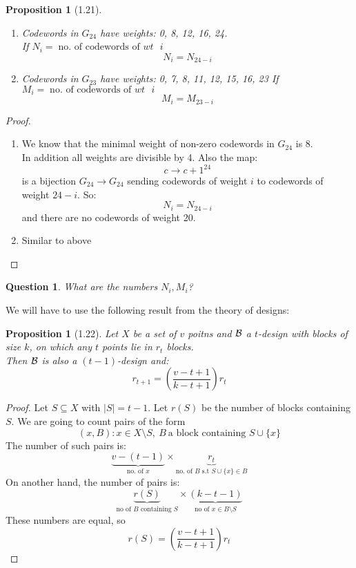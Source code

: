 \documentclass[]{article}
\newtheorem{prop}[thm]{Proposition}
\newtheorem*{quest}{Question}
\theoremstyle{definition}
\theoremstyle{remark}
\numberwithin{equation}{section}
\begin{document}
		\begin{prop}[1.21]\hfill
			\begin{enumerate}
				\item Codewords in $G_{24}$ have weights: 0, 8, 12, 16, 24.\\
					If $N_i = \; \text{no. of codewords of $wt$ $i$}$
					\[
						N_i = N_{24-i}
					\]
				\item Codewords in $G_{23}$ have weights: 0, 7, 8, 11, 12, 15, 16, 23
					If $M_i = \; \text{no. of codewords of $wt$ $i$}$
					\[
						M_i = M_{23-i}
					\]
			\end{enumerate}
		\end{prop}
		\begin{proof}\hfill
			\begin{enumerate}
				\item We know that the minimal weight of non-zero codewords in $G_{24}$ is 8.\\
				In addition all weights are divisible by 4. Also the map:\\
				\[
					c \longrightarrow c + 1^{24}
				\]
				is a bijection $G_{24} \rightarrow G_{24}$ sending codewords of weight $i$ to codewords of weight $24 - i$. So:
				\[
					N_i = N_{24-i}
				\]
				and there are no codewords of weight 20.
				\item Similar to above
			\end{enumerate}
		\end{proof}

		\begin{quest}What are the numbers $N_i, M_i$?\end{quest}

		We will have to use the following result from the theory of designs:
		\begin{prop}[1.22]\hfill
			Let $X$ be a set of $v$ poitns and $\mathcal B$ a $t$-design with blocks of size $k$, on which any $t$ points lie in $r_t$ blocks.\\
			Then $\mathcal B$ is also a $(t-1)$-design and:
			\[
				r_{t+1} = \left(\frac{v-t+1}{k-t+1}\right) r_t
			\]
		\end{prop}
		\begin{proof}Let $S \subseteq X$ with $|S| = t-1$. Let $r(S)$ be the number of blocks containing $S$. We are going to count pairs of the form
		\[
			(x, B) : x\in X\setminus S,\ B\ \text{a block containing $S \cup \{x\}$}
		\]
		The number of such pairs is:
		\[
			\underbrace{v - (t - 1)}_\text{no. of $x$} \times \underbrace{r_t}_\text{no. of $B$ s.t $S \cup \{x\} \in B$}
		\]
		On another hand, the number of pairs is:
		\[
			\underbrace{r(S)}_\text{no of $B$ containing $S$} \times \underbrace{(k - t - 1)}_\text{no of $x \in B \setminus S$}
		\]
		These numbers are equal, so
		\[
			r(S) = \left(\frac{v-t+1}{k-t+1}\right) r_t
		\]
		\end{proof}
\end{document}
